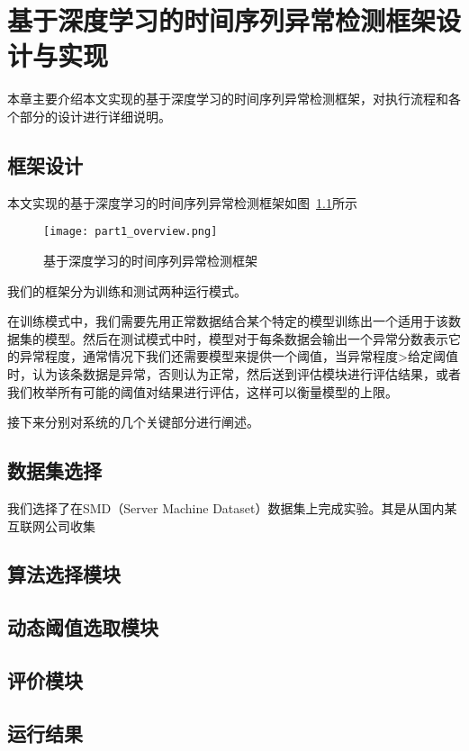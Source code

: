 
\chapter{基于深度学习的时间序列异常检测框架设计与实现}
\label{cha:intro}
本章主要介绍本文实现的基于深度学习的时间序列异常检测框架，对执行流程和各个部分的设计进行详细说明。
\section{框架设计}
本文实现的基于深度学习的时间序列异常检测框架如图~\ref{fig:part1_overview}所示

\begin{figure}[H]
    \centering
    \texttt{[image: part1\_overview.png]}
    \caption{基于深度学习的时间序列异常检测框架}
    \label{fig:part1_overview}
  \end{figure}

我们的框架分为训练和测试两种运行模式。

在训练模式中，我们需要先用正常数据结合某个特定的模型训练出一个适用于该数据集的模型。然后在测试模式中时，模型对于每条数据会输出一个异常分数表示它的异常程度，通常情况下我们还需要模型来提供一个阈值，当异常程度>给定阈值时，认为该条数据是异常，否则认为正常，然后送到评估模块进行评估结果，或者我们枚举所有可能的阈值对结果进行评估，这样可以衡量模型的上限。

接下来分别对系统的几个关键部分进行阐述。

\section{数据集选择}
我们选择了在SMD（Server Machine Dataset）\cite{su2019robust}数据集上完成实验。其是从国内某互联网公司收集

\section{算法选择模块}
\section{动态阈值选取模块}
\section{评价模块}
\section{运行结果}


